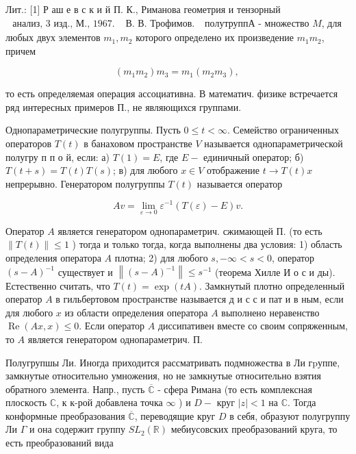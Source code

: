 \documentclass[10pt]{article}
\begin{document}
Лит.: [1] Р аш е в с к и й П. К., Риманова геометрия и тензорный $\begin{array}{ll}\text { анализ, } 3 \text { изд., М., } 1967 . & \text { В. В. Трофимов. }\end{array}$ полутруппА - множество $M$, для любых двух элементов $m_{1}, m_{2}$ которого определено их произведение $m_{1} m_{2}$, причем



\[

\left(m_{1} m_{2}\right) m_{3}=m_{1}\left(m_{2} m_{3}\right) \text {, }

\]



то есть определяемая операция ассоциативна. В математич. физике встречается ряд интересных примеров П., не являющихся группами.



Однопараметрические полугруппы. Пусть $0 \leqslant t<\infty$. Семейство ограниченных операторов $T(t)$ в банаховом пространстве $V$ называется однопараметрической полугру п п о й, если: а) $T(1)=E$, где $E-$ единичный оператор; б) $T(t+s)=T(t) T(s)$; в) для любого $x \in V$ отображение $t \rightarrow T(t) x$ непрерывно. Генератором полугруппы $T(t)$ называется оператор



\[

A v=\lim _{\varepsilon \rightarrow 0} \varepsilon^{-1}(T(\varepsilon)-E) v .

\]



Оператор $A$ является генератором однопараметрич. сжимающей П. (то есть $\|T(t)\| \leqslant 1$ ) тогда и только тогда, когда выполнены два условия: 1) область определения оператора $A$ плотна; 2) для любого $s,-\infty<s<0$, оператор $(s-A)^{-1}$ существует и $\left\|(s-A)^{-1}\right\| \leqslant s^{-1}$ (теорема Хилле И о с и ды). Естественно считать, что $T(t)=\exp (t A)$. Замкнутый плотно определенный оператор $A$ в гильбертовом пространстве называется д и с с и пат и в ным, если для любого $x$ из области определения оператора $A$ выполнено неравенство $\operatorname{Re}(A x, x) \leqslant 0$. Если оператор $A$ диссипативен вместе со своим сопряженным, то $A$ является генератором однопараметрич. П.



Полугрупшы Ли. Иногда приходится рассматривать подмножества в Ли гpуппе, замкнутые относительно умножения, но не замкнутые относительно взятия обратного элемента. Напр., пусть $\overline{\mathbb{C}}$ - сфера Римана (то есть комплексная плоскость $\mathbb{C}$, к к-рой добавлена точка $\infty$ ) и $D-$ круг $|z|<1$ на $\mathbb{C}$. Тогда конформные преобразования $\overline{\mathbb{C}}$, переводящие круг $D$ в себя, образуют полугруппу Ли $\Gamma$ и она содержит группу $S L_{2}(\mathbb{R})$ мебиусовских преобразований круга, то есть преобразований вида
\end{document}

